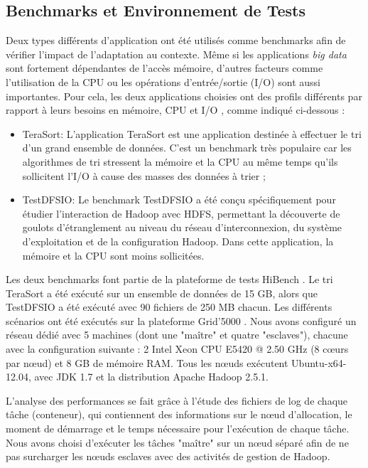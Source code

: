 \subsection{Benchmarks et Environnement de Tests}

Deux types différents d'application ont été utilisés comme benchmarks afin de vérifier l'impact de l'adaptation au contexte. Même si les applications \textit{big data} sont fortement dépendantes de l'accès mémoire, d'autres facteurs comme l'utilisation de la CPU ou les opérations d'entrée/sortie (I/O) sont aussi importantes. Pour cela, les deux applications choisies ont des profils différents par rapport à leurs besoins en mémoire, CPU et  I/O \cite{Benchmarks}, comme indiqué ci-dessous :
\begin{itemize}
	\item TeraSort: L'application TeraSort \cite{TeraSort2008} est une application destinée à effectuer le tri d'un grand ensemble de données. C'est un benchmark très populaire car les algorithmes de tri stressent la mémoire et la CPU au même temps qu'ils sollicitent l'I/O à cause des masses des données à trier ;
	\item TestDFSIO: Le benchmark TestDFSIO a été conçu spécifiquement pour étudier l'interaction de Hadoop avec HDFS, permettant la découverte de goulots d'étranglement au niveau du réseau d'interconnexion, du système d'exploitation et de la configuration Hadoop. Dans cette application, la mémoire et la CPU sont moins sollicitées.
\end{itemize}

Les deux benchmarks font partie de la plateforme de tests HiBench \cite{HiBench}. Le tri TeraSort a été exécuté sur un ensemble de données de 15 GB, alors que TestDFSIO a été exécuté avec 90 fichiers de 250 MB chacun. Les différents scénarios ont été exécutés sur la plateforme Grid'5000 \cite{g5k}. Nous avons configuré un réseau dédié avec 5 machines (dont une "maître" et quatre "esclaves"), chacune avec la configuration suivante : 2 Intel Xeon CPU E5420 @ 2.50 GHz (8 c{\oe}urs par n{\oe}ud) et 8 GB de mémoire RAM. Tous les n{\oe}uds exécutent Ubuntu-x64-12.04, avec JDK 1.7 et la distribution Apache Hadoop 2.5.1. 

L'analyse des performances se fait grâce à l'étude des fichiers de log de chaque tâche (conteneur), qui contiennent des informations sur le n{\oe}ud d'allocation, le moment de démarrage et le temps nécessaire pour l'exécution de chaque tâche. Nous avons choisi d'exécuter les tâches "maître" sur un n{\oe}ud séparé afin de ne pas surcharger les n{\oe}uds esclaves avec des activités de gestion de Hadoop. 

